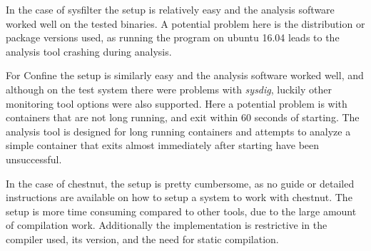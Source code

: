 In the case of sysfilter the setup is relatively easy and the analysis software worked well on the tested binaries. A potential problem here is the distribution or package versions used, as running the program on ubuntu 16.04 leads to the analysis tool crashing during analysis.

For Confine the setup is similarly easy and the analysis software worked well, and although on the test system there were problems with \textit{sysdig}, luckily other monitoring tool options were also supported.
Here a potential problem is with containers that are not long running, and exit within 60 seconds of starting. The analysis tool is designed for long running containers and attempts to analyze a simple container that exits almost immediately after starting have been unsuccessful.

In the case of chestnut, the setup is pretty cumbersome, as no guide or detailed instructions are available on how to setup a system to work with chestnut.
The setup is more time consuming compared to other tools, due to the large amount of compilation work.
Additionally the implementation is restrictive in the compiler used, its version, and the need for static compilation.

